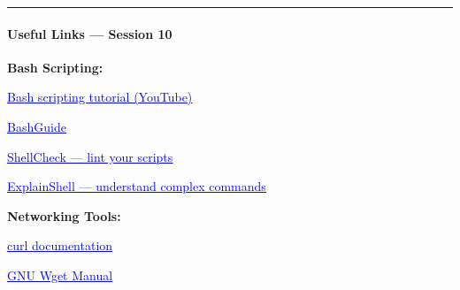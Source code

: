 \documentclass[
  english,
  paper=a4,
  oneside  ,captions=tableheading
]{scrartcl}
\begin{document}
\begin{center}\rule{0.5\linewidth}{0.5pt}\end{center}

\paragraph{Useful Links --- Session 10}\label{useful-links-session-10}

\textbf{Bash Scripting:}

%
  \par\vspace{0.5ex}%
  \href{https://youtu.be/tK9Oc6AEnR4?si=y3M0s1AIVfqtzCJB}{\textcolor{blue}{\underline{\faLink\quad Bash scripting tutorial (YouTube)}}}%
  \par\vspace{0.5ex}%

%
  \par\vspace{0.5ex}%
  \href{https://mywiki.wooledge.org/BashGuide}{\textcolor{blue}{\underline{\faLink\quad BashGuide}}}%
  \par\vspace{0.5ex}%

%
  \par\vspace{0.5ex}%
  \href{https://www.shellcheck.net/}{\textcolor{blue}{\underline{\faLink\quad ShellCheck — lint your scripts}}}%
  \par\vspace{0.5ex}%

%
  \par\vspace{0.5ex}%
  \href{https://explainshell.com/}{\textcolor{blue}{\underline{\faLink\quad ExplainShell — understand complex commands}}}%
  \par\vspace{0.5ex}%

\textbf{Networking Tools:}

%
  \par\vspace{0.5ex}%
  \href{https://curl.se/docs/}{\textcolor{blue}{\underline{\faLink\quad curl documentation}}}%
  \par\vspace{0.5ex}%

%
  \par\vspace{0.5ex}%
  \href{https://www.gnu.org/software/wget/manual/wget.html}{\textcolor{blue}{\underline{\faLink\quad GNU Wget Manual}}}%
  \par\vspace{0.5ex}%
\end{document}
